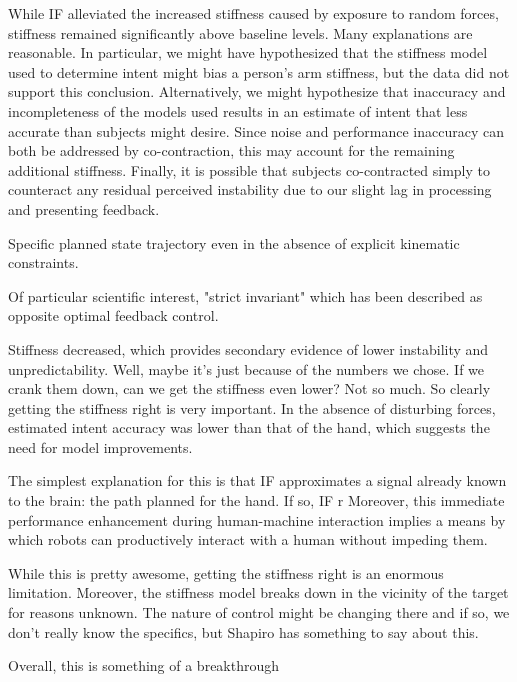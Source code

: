 \documentclass{frontiersSCNS} %
\begin{document}
While IF alleviated the increased stiffness caused by exposure to random forces, stiffness remained significantly above baseline levels. Many explanations are reasonable. In particular, we might have hypothesized that the stiffness model used to determine intent might bias a person's arm stiffness, but the data did not support this conclusion. Alternatively, we might hypothesize that inaccuracy and incompleteness of the models used results in an estimate of intent that less accurate than subjects might desire. Since noise and performance inaccuracy can both be addressed by co-contraction, this may account for the remaining additional stiffness. Finally, it is possible that subjects co-contracted simply to counteract any residual perceived instability due to our slight lag in processing and presenting feedback.



Specific planned state trajectory even in the absence of explicit kinematic constraints.

Of particular scientific interest, "strict invariant" which has been described as opposite optimal feedback control.


Stiffness decreased, which provides secondary evidence of lower instability and unpredictability. Well, maybe it's just because of the numbers we chose. If we crank them down, can we get the stiffness even lower? Not so much. So clearly getting the stiffness right is very important.
In the absence of disturbing forces, estimated intent accuracy was lower than
that of the hand, which suggests the need for model improvements.

 The simplest explanation for this is that IF approximates a signal already known to the brain: the path planned for the hand. If so, IF r Moreover, this immediate performance enhancement during human-machine interaction implies a means by which robots can productively interact with a human without impeding them.





While this is pretty awesome, getting the stiffness right is an enormous limitation. Moreover, the stiffness model breaks down in the vicinity of the target for reasons unknown. The nature of control might be changing there and if so, we don't really know the specifics, but Shapiro has something to say about this.

Overall, this is something of a breakthrough
\end{document}
